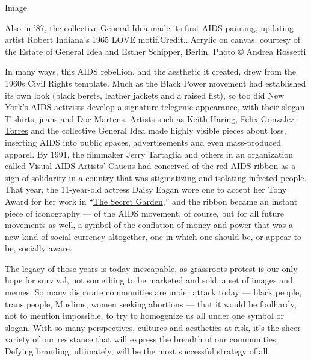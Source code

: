 Image

Also in '87, the collective General Idea made its first AIDS painting,
updating artist Robert Indiana's 1965 LOVE motif.Credit...Acrylic on
canvas, courtesy of the Estate of General Idea and Esther Schipper,
Berlin. Photo © Andrea Rossetti

In many ways, this AIDS rebellion, and the aesthetic it created, drew
from the 1960s Civil Rights template. Much as the Black Power movement
had established its own look (black berets, leather jackets and a raised
fist), so too did New York's AIDS activists develop a signature
telegenic appearance, with their slogan T-shirts, jeans and Doc Martens.
Artists such as
\href{https://www.nytimes.com/1990/02/17/obituaries/keith-haring-artist-dies-at-31-career-began-in-subway-graffiti.html}{Keith
Haring},
\href{http://www.nytimes.com/1996/01/11/nyregion/felix-gonzalez-torres-38-a-sculptor-of-love-and-loss.html}{Felix
Gonzalez-Torres} and the collective General Idea made highly visible
pieces about loss, inserting AIDS into public spaces, advertisements and
even mass-produced apparel. By 1991, the filmmaker Jerry Tartaglia and
others in an organization called
\href{https://www.visualaids.org/projects/detail/visual-aids-artists-caucus}{Visual
AIDS Artists' Caucus} had conceived of the red AIDS ribbon as a sign of
solidarity in a country that was stigmatizing and isolating infected
people. That year, the 11-year-old actress Daisy Eagan wore one to
accept her Tony Award for her work in
``\href{https://www.nytimes.com/1991/04/26/theater/review-theater-garden-the-secret-of-death-and-birth.html}{The
Secret Garden},'' and the ribbon became an instant piece of iconography
--- of the AIDS movement, of course, but for all future movements as
well, a symbol of the conflation of money and power that was a new kind
of social currency altogether, one in which one should be, or appear to
be, socially aware.

The legacy of those years is today inescapable, as grassroots protest is
our only hope for survival, not something to be marketed and sold, a set
of images and memes. So many disparate communities are under attack
today --- black people, trans people, Muslims, women seeking abortions
--- that it would be foolhardy, not to mention impossible, to try to
homogenize us all under one symbol or slogan. With so many perspectives,
cultures and aesthetics at risk, it's the sheer variety of our
resistance that will express the breadth of our communities. Defying
branding, ultimately, will be the most successful strategy of all.

